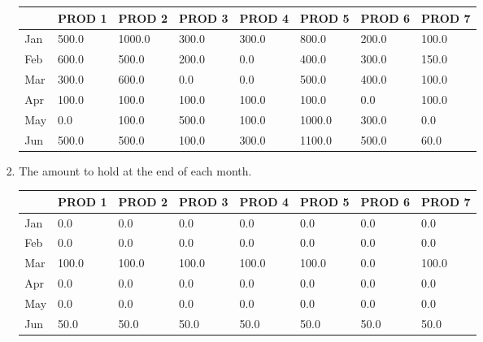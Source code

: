 \documentclass[12pt,a4paper]{article}
\theoremstyle{definition}
\begin{document}
\begin{enumerate}
\begin{enumerate}
\begin{enumerate}
\begin{enumerate}
         \begin{table}[htbp]
      \scriptsize
      \centering
      \renewcommand\arraystretch{1.1}
      \begin{tabular}{m{} m{}<{\centering} m{}<{\centering} m{}<{\centering} m{}<{\centering} m{}<{\centering} m{}<{\centering} m{}<{\centering}}
      \hline
       & \textbf{PROD 1} & \textbf{PROD 2} & \textbf{PROD 3} & \textbf{PROD 4} & \textbf{PROD 5} & \textbf{PROD 6} &  \textbf{PROD 7} \\\hline      
    Jan	& 500.0	& 1000.0	& 300.0	& 300.0	& 800.0	& 200.0	& 100.0\\
    Feb	& 600.0	& 500.0	& 200.0	& 0.0	& 400.0	& 300.0	& 150.0\\
    Mar	& 300.0	& 600.0	& 0.0	& 0.0	& 500.0	& 400.0	& 100.0\\
    Apr	& 100.0	& 100.0	& 100.0	& 100.0	& 100.0	& 0.0	& 100.0\\
    May	& 0.0	& 100.0	& 500.0	& 100.0	& 1000.0	& 300.0	& 0.0\\
    Jun	& 500.0	& 500.0	& 100.0	& 300.0	& 1100.0	& 500.0	& 60.0\\

      \hline
      \end{tabular}
    \end{table}
    
    \newpage

    \item
    The amount to hold at the end of each month.
    
    \begin{table}[htbp]
      \scriptsize
      \centering
      \renewcommand\arraystretch{1.1}
      \begin{tabular}{m{} m{}<{\centering} m{}<{\centering} m{}<{\centering} m{}<{\centering} m{}<{\centering} m{}<{\centering} m{}<{\centering}}
      \hline
       & \textbf{PROD 1} & \textbf{PROD 2} & \textbf{PROD 3} & \textbf{PROD 4} & \textbf{PROD 5} & \textbf{PROD 6} &  \textbf{PROD 7} \\\hline      
    Jan	& 0.0	& 0.0	& 0.0	& 0.0	& 0.0	& 0.0	& 0.0\\
    Feb	& 0.0	& 0.0	& 0.0	& 0.0	& 0.0	& 0.0	& 0.0\\
    Mar	& 100.0	& 100.0	& 100.0	& 100.0	& 100.0	& 0.0	& 100.0\\
    Apr	& 0.0	& 0.0	& 0.0	& 0.0	& 0.0	& 0.0	& 0.0\\
    May	& 0.0	& 0.0	& 0.0	& 0.0	& 0.0	& 0.0	& 0.0\\
    Jun	& 50.0	& 50.0	& 50.0	& 50.0	& 50.0	& 50.0	& 50.0\\


\end{tabular}
\end{table}
\end{enumerate}
\end{enumerate}
\end{enumerate}
\end{enumerate}
\end{document}
